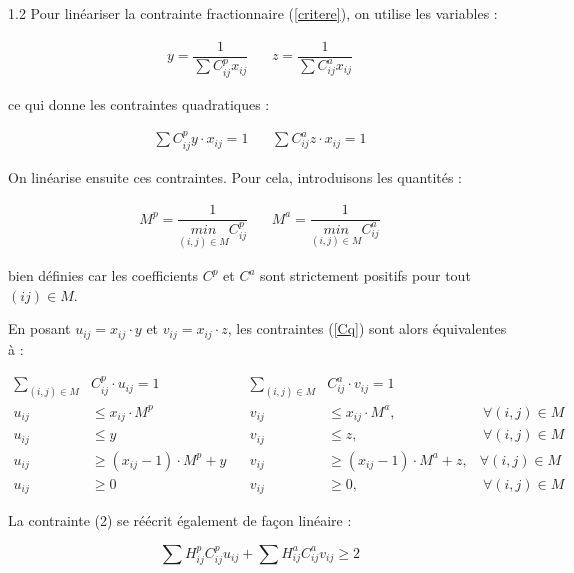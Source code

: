 \documentclass[12pt,a4paper]{article}
\begin{document}
\vspace{0.5cm}

1.2 Pour linéariser la contrainte fractionnaire (\ref{critere}), on utilise les variables :

\begin{align*}
y=\dfrac{1}{\sum C_{ij}^p x_{ij}} \ \ & \ \  z =\dfrac{1}{\sum C_{ij}^a x_{ij}}
\end{align*}

ce qui donne les contraintes quadratiques :

\begin{align} \label{Cq}
 \sum C_{ij}^p y \cdot x_{ij} = 1 \ \ & \ \   \sum C_{ij}^a z \cdot x_{ij} = 1
\end{align}

On linéarise ensuite ces contraintes. Pour cela, introduisons les quantités :

\begin{align*}
M^{p} = \dfrac{1}{\underset{(i,j) \in M }{min} C_{ij}^p} \ \ & \ \ M^{a} = \dfrac{1}{\underset{(i,j) \in M }{min} C_{ij}^a} 
\end{align*}

bien définies car les coefficients $C^p $ et $C^a$ sont strictement positifs pour tout $(ij) \in M$.

En posant $u_{ij} = x_{ij} \cdot y$ et $v_{ij} = x_{ij} \cdot z$, les contraintes (\ref{Cq}) sont alors équivalentes à :

\begin{align} \label{Clin1}
\sum_{(i,j) \in M} & C^p_{ij}\cdot u_{ij} =1 \ \ & \ \ \sum_{(i,j) \in M} & C^a_{ij}\cdot v_{ij} =1 \  & \\
\label{Clin2} u_{ij} & \leq x_{ij} \cdot M^p \ \ & \ \  v_{ij} &\leq x_{ij} \cdot M^a, &\ \forall (i,j) \in M  \\
\label{Clin3} u_{ij} & \leq y  \ \ & \ \  v_{ij} & \leq z, &\ \forall (i,j) \in M  \\
\label{Clin4} u_{ij} & \geq (x_{ij}-1) \cdot M^p +y\ \ & \ \ v_{ij} & \geq (x_{ij}-1) \cdot M^a +z, & \forall (i,j) \in M \\
\label{Clin5} u_{ij} & \geq 0 \ \ & \ \  v_{ij} & \geq 0, &\ \forall (i,j) \in M  
\end{align}

La contrainte (2) se réécrit également de façon linéaire :

\begin{equation} \label{critereLin}
\sum H_{ij}^p C_{ij}^p u_{ij} + \sum H_{ij}^aC_{ij}^a v_{ij} \geq 2
\end{equation}
\end{document}
